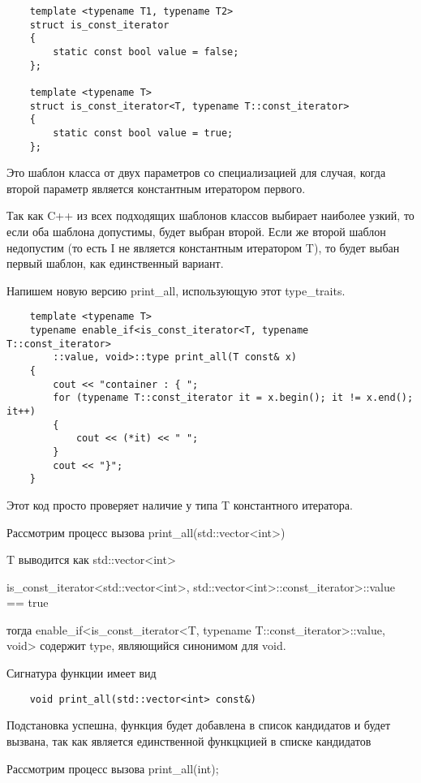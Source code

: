 	\begin{verbatim}
	template <typename T1, typename T2>
	struct is_const_iterator
	{
        static const bool value = false;
	};

	template <typename T>
	struct is_const_iterator<T, typename T::const_iterator>
	{
 	    static const bool value = true;
	};
	\end{verbatim}
	
	Это шаблон класса от двух параметров со специализацией для случая, когда второй параметр является константным итератором первого. 
	
	Так как C++ из всех подходящих шаблонов классов выбирает наиболее узкий, то если оба шаблона допустимы, будет выбран второй. Если же второй шаблон недопустим (то есть I не является константным итератором T), то будет выбан первый шаблон, как единственный вариант.
	
	Напишем новую версию print\_all, использующую этот type\_traits.
	
	\begin{verbatim}
	template <typename T>
	typename enable_if<is_const_iterator<T, typename T::const_iterator>
	    ::value, void>::type print_all(T const& x)
	{
	    cout << "container : { ";
 	    for (typename T::const_iterator it = x.begin(); it != x.end(); it++)
	    {
            cout << (*it) << " ";
	    }
	    cout << "}";
	}
	\end{verbatim}

	Этот код просто проверяет наличие у типа T константного итератора.
	
	Рассмотрим процесс вызова print\_all(std::vector<int>)
	
	T выводится как std::vector<int>
	
	is\_const\_iterator<std::vector<int>, std::vector<int>::const\_iterator>::value == true
	
	тогда enable\_if<is\_const\_iterator<T, typename T::const\_iterator>::value, void> содержит type, являющийся синонимом для void.
	
	Сигнатура функции имеет вид
	
	\begin{verbatim}
	void print_all(std::vector<int> const&)
	\end{verbatim}

	Подстановка успешна, функция будет добавлена в список кандидатов и будет вызвана, так как является единственной функцкцией в списке кандидатов
	
	Рассмотрим процесс вызова print\_all(int);
	
